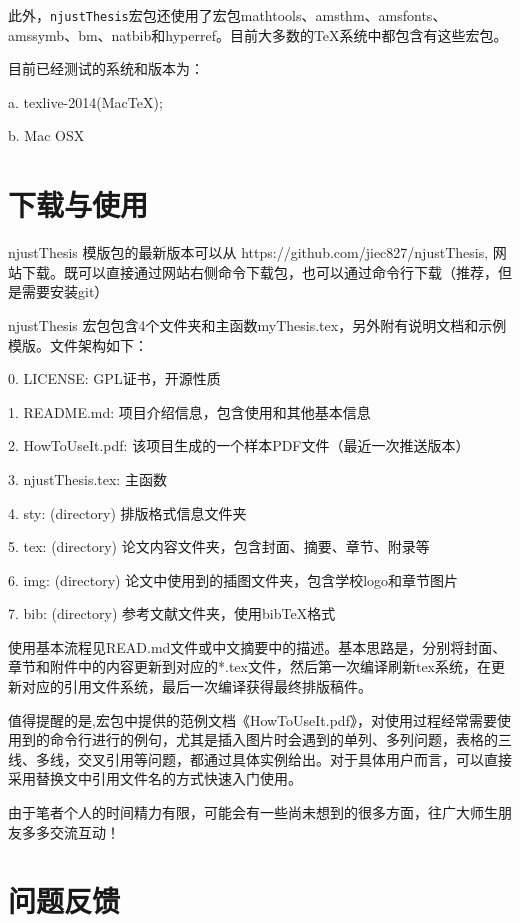 此外，\texttt{njustThesis}宏包还使用了宏包mathtools、amsthm、amsfonts、amssymb、bm、natbib和hyperref。目前大多数的\TeX{}系统中都包含有这些宏包。

目前已经测试的系统和版本为：

a. texlive-2014(MacTeX);

b. Mac OSX 

\section{下载与使用}
\label{sec:howtouse}
njustThesis 模版包的最新版本可以从 https://github.com/jiec827/njustThesis, 网站下载。既可以直接通过网站右侧命令下载包，也可以通过命令行下载（推荐，但是需要安装git）

\begin{center}
  {\color{blue}{git clone https://github.com/jiec827/njustThesis}}
\end{center}


njustThesis 宏包包含4个文件夹和主函数myThesis.tex，另外附有说明文档和示例模版。文件架构如下：

0. LICENSE: GPL证书，开源性质

1. README.md: 项目介绍信息，包含使用和其他基本信息

2. HowToUseIt.pdf: 该项目生成的一个样本PDF文件（最近一次推送版本）

3. njustThesis.tex: 主函数

4. sty: (directory) 排版格式信息文件夹

5. tex: (directory) 论文内容文件夹，包含封面、摘要、章节、附录等

6. img: (directory) 论文中使用到的插图文件夹，包含学校logo和章节图片

7. bib: (directory) 参考文献文件夹，使用bibTeX格式

使用基本流程见READ.md文件或中文摘要中的描述。基本思路是，分别将封面、章节和附件中的内容更新到对应的*.tex文件，然后第一次编译刷新tex系统，在更新对应的引用文件系统，最后一次编译获得最终排版稿件。

值得提醒的是,宏包中提供的范例文档《HowToUseIt.pdf》，对使用过程经常需要使用到的命令行进行的例句，尤其是插入图片时会遇到的单列、多列问题，表格的三线、多线，交叉引用等问题，都通过具体实例给出。对于具体用户而言，可以直接采用替换文中引用文件名的方式快速入门使用。

由于笔者个人的时间精力有限，可能会有一些尚未想到的很多方面，往广大师生朋友多多交流互动！

\section{问题反馈}
\label{sec:FandQ}


